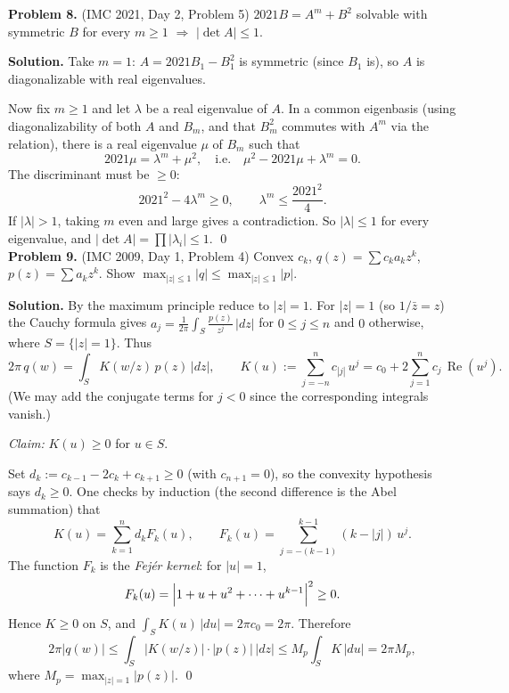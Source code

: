 \documentclass{article}
\begin{document}
\textbf{Problem 8.} (IMC 2021, Day 2, Problem 5)
\( 2021 B = A^m + B^2 \) solvable with symmetric \( B \) for every \( m \geq 1 \) \( \Rightarrow \) \( |\det A| \leq 1 \).

\textbf{Solution.}
Take \( m = 1 \): \( A = 2021 B_1 - B_1^2 \) is symmetric (since \( B_1 \) is), so \( A \) is diagonalizable with real eigenvalues.

Now fix \( m \geq 1 \) and let \( \lambda \) be a real eigenvalue of \( A \). In a common eigenbasis (using diagonalizability of both \( A \) and \( B_m \), and that \( B_m^2 \) commutes with \( A^m \) via the relation), there is a real eigenvalue \( \mu \) of \( B_m \) such that
\[
2021 \mu = \lambda^m + \mu^2, \quad \text{i.e.}\quad \mu^2 - 2021 \mu + \lambda^m = 0.
\]
The discriminant must be \( \geq 0 \):
\[
2021^2 - 4 \lambda^m \geq 0, \qquad \lambda^m \leq \frac{2021^2}{4}.
\]
If \( |\lambda| > 1 \), taking \( m \) even and large gives a contradiction. So \( |\lambda| \leq 1 \) for every eigenvalue, and \( |\det A| = \prod |\lambda_i| \leq 1 \). \qed
\\

\textbf{Problem 9.} (IMC 2009, Day 1, Problem 4)
Convex \( c_k \), \( q(z) = \sum c_k a_k z^k \), \( p(z) = \sum a_k z^k \). Show \( \max_{|z| \leq 1} |q| \leq \max_{|z| \leq 1} |p| \).

\textbf{Solution.}
By the maximum principle reduce to \( |z| = 1 \). For \( |z| = 1 \) (so \( 1/\bar z = z \)) the Cauchy formula gives \( a_j = \frac{1}{2\pi} \int_S \frac{p(z)}{z^j}\, |dz| \) for \( 0 \leq j \leq n \) and \( 0 \) otherwise, where \( S = \{|z| = 1\} \). Thus
\[
2\pi\, q(w) = \int_S K(w/z)\, p(z)\, |dz|, \qquad K(u) := \sum_{j = -n}^{n} c_{|j|}\, u^j = c_0 + 2 \sum_{j = 1}^{n} c_j\, \operatorname{Re}(u^j).
\]
(We may add the conjugate terms for \( j < 0 \) since the corresponding integrals vanish.)

\emph{Claim:} \( K(u) \geq 0 \) for \( u \in S \).

Set \( d_k := c_{k-1} - 2 c_k + c_{k+1} \geq 0 \) (with \( c_{n+1} = 0 \)), so the convexity hypothesis says \( d_k \geq 0 \). One checks by induction (the second difference is the Abel summation) that
\[
K(u) = \sum_{k = 1}^{n} d_k F_k(u), \qquad F_k(u) = \sum_{j = -(k-1)}^{k-1} (k - |j|)\, u^j.
\]
The function \( F_k \) is the \emph{Fejér kernel}: for \( |u| = 1 \),
\[
F_k(u) = \Bigl|1 + u + u^2 + \cdots + u^{k-1}\Bigr|^2 \geq 0.
\]
Hence \( K \geq 0 \) on \( S \), and \( \int_S K(u)\, |du| = 2\pi c_0 = 2\pi \). Therefore
\[
2\pi |q(w)| \leq \int_S |K(w/z)| \cdot |p(z)|\, |dz| \leq M_p \int_S K\, |du| = 2\pi M_p,
\]
where \( M_p = \max_{|z|=1} |p(z)| \). \qed
\\
\end{document}
